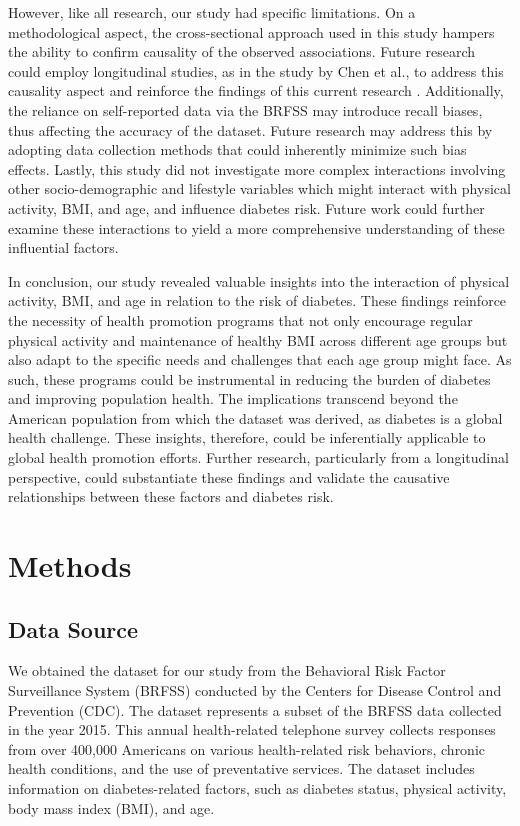 \documentclass[11pt]{article}
\begin{document}
However, like all research, our study had specific limitations. On a methodological aspect, the cross-sectional approach used in this study hampers the ability to confirm causality of the observed associations. Future research could employ longitudinal studies, as in the study by Chen et al., to address this causality aspect and reinforce the findings of this current research \cite{Chen2018AssociationOB}. Additionally, the reliance on self-reported data via the BRFSS may introduce recall biases, thus affecting the accuracy of the dataset. Future research may address this by adopting data collection methods that could inherently minimize such bias effects. Lastly, this study did not investigate more complex interactions involving other socio-demographic and lifestyle variables which might interact with physical activity, BMI, and age, and influence diabetes risk. Future work could further examine these interactions to yield a more comprehensive understanding of these influential factors.

In conclusion, our study revealed valuable insights into the interaction of physical activity, BMI, and age in relation to the risk of diabetes. These findings reinforce the necessity of health promotion programs that not only encourage regular physical activity and maintenance of healthy BMI across different age groups but also adapt to the specific needs and challenges that each age group might face. As such, these programs could be instrumental in reducing the burden of diabetes and improving population health. The implications transcend beyond the American population from which the dataset was derived, as diabetes is a global health challenge. These insights, therefore, could be inferentially applicable to global health promotion efforts. Further research, particularly from a longitudinal perspective, could substantiate these findings and validate the causative relationships between these factors and diabetes risk.

\section*{Methods}

\subsection*{Data Source}
We obtained the dataset for our study from the Behavioral Risk Factor Surveillance System (BRFSS) conducted by the Centers for Disease Control and Prevention (CDC). The dataset represents a subset of the BRFSS data collected in the year 2015. This annual health-related telephone survey collects responses from over 400,000 Americans on various health-related risk behaviors, chronic health conditions, and the use of preventative services. The dataset includes information on diabetes-related factors, such as diabetes status, physical activity, body mass index (BMI), and age.
\end{document}
